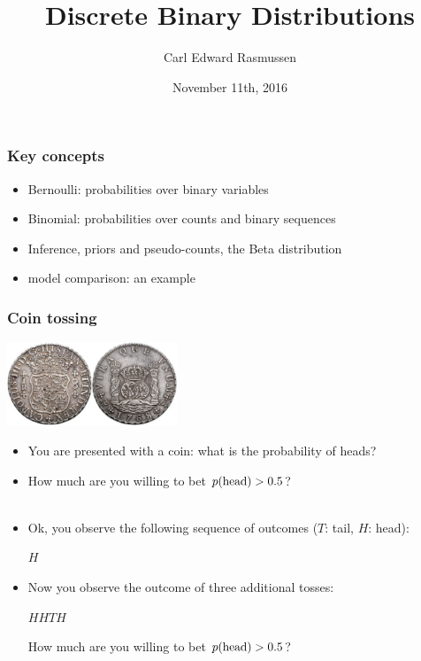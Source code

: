 

\title{Discrete Binary Distributions}
\author{Carl Edward Rasmussen}
\date{November 11th, 2016}




\begin{frame}
\titlepage
\end{frame}


\begin{frame}
\frametitle{Key concepts}

\begin{itemize}
\item Bernoulli: probabilities over binary variables
\item Binomial: probabilities over counts and binary sequences
\item Inference, priors and pseudo-counts, the Beta distribution
\item model comparison: an example
\end{itemize}
\end{frame}


\begin{frame}
\frametitle{Coin tossing}

\centerline{\includegraphics[width=0.38\textwidth]{coin}}

\begin{itemize}
\item You are presented with a coin: what is the probability of heads?\\
\hfill{}

\item How much are you willing to bet $p({\rm head})>0.5$?\\
\hfill{}\\
\hfill{}

\item Ok, you observe the following sequence of outcomes ($T$: tail, $H$: head):\\
\centerline{$H$}
\hfill{}

\item Now you observe the outcome of three additional tosses:\\
\centerline{$H HTH$}
How much are you  willing to bet $p({\rm head})>0.5$?
\end{itemize}

\end{frame}


